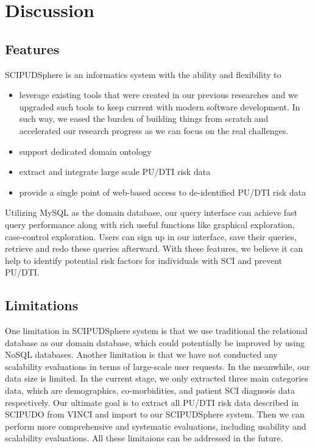 \documentclass{amia}
\begin{document}
\section{Discussion}
\subsection{Features}
SCIPUDSphere is an informatics system with the ability and flexibility to
\begin{itemize}
  \item leverage existing tools that were created in our previous researches and we upgraded such tools to keep current with modern software development. In such way, we eased the burden of building things from scratch and accelerated our research progress as we can focus on the real challenges.
  \item support dedicated domain ontology
  \item extract and integrate large scale PU/DTI risk data
  \item provide a single point of web-based access to de-identified PU/DTI risk data
\end{itemize}
Utilizing MySQL as the domain database, our query interface can achieve fast query performance along with rich useful functions like graphical exploration, case-control exploration. Users can sign up in our interface, save their queries, retrieve and redo these queries afterward. With these features, we believe it can help to identify potential risk factors for individuals with SCI and prevent PU/DTI. 

\subsection{Limitations}
One limitation in SCIPUDSphere system is that we use traditional the relational database as our domain database, which could potentially be improved by using NoSQL databases. Another limitation is that we have not conducted any scalability evaluations in terms of large-scale user requests. In the meanwhile, our data size is limited. In the current stage, we only extracted three main categories data, which are demographics, co-morbidities, and patient SCI diagnosis data respectively. Our ultimate goal is to extract all PU/DTI risk data described in SCIPUDO from VINCI and import to our SCIPUDSphere system. Then we can perform more comprehensive and systematic evaluations, including usability and scalability evaluations. All these limitaions can be addressed in the future.
\end{document}
